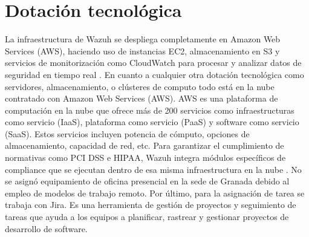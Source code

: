 \section{Dotación tecnológica}
La infraestructura de Wazuh se despliega completamente en Amazon Web Services (AWS), haciendo uso de instancias EC2, almacenamiento en S3 y servicios de monitorización como CloudWatch para procesar y analizar datos de seguridad en tiempo real \cite{wazuh_agent_installation}. En cuanto a cualquier otra dotación tecnológica como servidores, almacenamiento, o clústeres de computo todo está en la nube contratado con Amazon Web Services (AWS). AWS es una plataforma de computación en la nube que ofrece más de 200 servicios como infraestructuras como servicio (IaaS), plataforma como servicio
(PaaS) y software como servicio (SaaS). Estos servicios incluyen potencia de cómputo, opciones de almacenamiento, capacidad de red, etc.
Para garantizar el cumplimiento de normativas como PCI DSS e HIPAA, Wazuh integra módulos específicos de compliance que se ejecutan dentro de esa misma infraestructura en la nube \cite{wazuh_regulatory_compliance}. No se asignó equipamiento de oficina presencial en la sede de Granada debido al empleo de modelos de trabajo remoto.
Por último, para la asignación de tarea se trabaja con Jira. Es una herramienta de gestión de proyectos y seguimiento de tareas que ayuda a los equipos a planificar, rastrear y gestionar proyectos de desarrollo de software.
